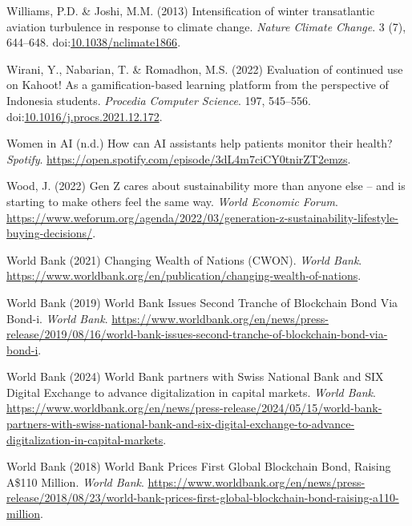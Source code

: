 \documentclass[
  letterpaper,
  DIV=11,
  numbers=noendperiod]{scrartcl}
\newlength{\cslhangindent}
\newenvironment{CSLReferences}[2] %
 {\begin{list}{}{%
  \setlength{\itemindent}{0pt}
  \setlength{\leftmargin}{0pt}
  \setlength{\parsep}{0pt}
  \ifodd #1
   \setlength{\leftmargin}{\cslhangindent}
   \setlength{\itemindent}{-1\cslhangindent}
  \fi
  \setlength{\itemsep}{#2\baselineskip}}}
 {\end{list}}
\begin{document}
\begin{CSLReferences}{0}{1}
Williams, P.D. \& Joshi, M.M. (2013) Intensification of winter
transatlantic aviation turbulence in response to climate change.
\emph{Nature Climate Change}. 3 (7), 644--648.
doi:\href{https://doi.org/10.1038/nclimate1866}{10.1038/nclimate1866}.

Wirani, Y., Nabarian, T. \& Romadhon, M.S. (2022) Evaluation of
continued use on {Kahoot}! As a gamification-based learning platform
from the perspective of {Indonesia} students. \emph{Procedia Computer
Science}. 197, 545--556.
doi:\href{https://doi.org/10.1016/j.procs.2021.12.172}{10.1016/j.procs.2021.12.172}.

Women in AI (n.d.) How can {AI} assistants help patients monitor their
health? \emph{Spotify}.
\url{https://open.spotify.com/episode/3dL4m7ciCY0tnirZT2emzs}.

Wood, J. (2022) Gen {Z} cares about sustainability more than anyone else
-- and is starting to make others feel the same way. \emph{World
Economic Forum}.
\url{https://www.weforum.org/agenda/2022/03/generation-z-sustainability-lifestyle-buying-decisions/}.

World Bank (2021) Changing {Wealth} of {Nations} ({CWON}). \emph{World
Bank}.
\url{https://www.worldbank.org/en/publication/changing-wealth-of-nations}.

World Bank (2019) World {Bank Issues Second Tranche} of {Blockchain Bond
Via Bond-i}. \emph{World Bank}.
\url{https://www.worldbank.org/en/news/press-release/2019/08/16/world-bank-issues-second-tranche-of-blockchain-bond-via-bond-i}.

World Bank (2024) World {Bank} partners with {Swiss National Bank} and
{SIX Digital Exchange} to advance digitalization in capital markets.
\emph{World Bank}.
\url{https://www.worldbank.org/en/news/press-release/2024/05/15/world-bank-partners-with-swiss-national-bank-and-six-digital-exchange-to-advance-digitalization-in-capital-markets}.

World Bank (2018) World {Bank Prices First Global Blockchain Bond},
{Raising A}\$110 {Million}. \emph{World Bank}.
\url{https://www.worldbank.org/en/news/press-release/2018/08/23/world-bank-prices-first-global-blockchain-bond-raising-a110-million}.


\end{CSLReferences}
\end{document}

